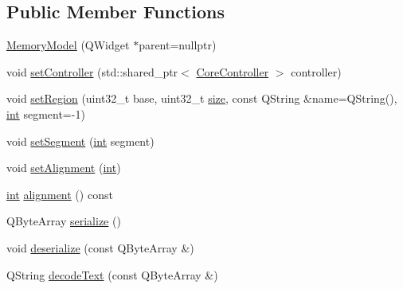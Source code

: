 \subsection*{Public Member Functions}
\begin{DoxyCompactItemize}
\item 
\mbox{\hyperlink{class_q_g_b_a_1_1_memory_model_a2311edb2695429110ac76feed01f57b2}{Memory\+Model}} (Q\+Widget $\ast$parent=nullptr)
\item 
void \mbox{\hyperlink{class_q_g_b_a_1_1_memory_model_acb6e5426f51a6a96e2861d2faef7bbfb}{set\+Controller}} (std\+::shared\+\_\+ptr$<$ \mbox{\hyperlink{class_q_g_b_a_1_1_core_controller}{Core\+Controller}} $>$ controller)
\item 
void \mbox{\hyperlink{class_q_g_b_a_1_1_memory_model_ab88fae3068abbdbb73095cbb5ef7fc79}{set\+Region}} (uint32\+\_\+t base, uint32\+\_\+t \mbox{\hyperlink{ioapi_8h_a014d89bd76f74ef3a29c8f04b473eb76}{size}}, const Q\+String \&name=Q\+String(), \mbox{\hyperlink{ioapi_8h_a787fa3cf048117ba7123753c1e74fcd6}{int}} segment=-\/1)
\item 
void \mbox{\hyperlink{class_q_g_b_a_1_1_memory_model_af72ed178d4890921fdabf860139e61fc}{set\+Segment}} (\mbox{\hyperlink{ioapi_8h_a787fa3cf048117ba7123753c1e74fcd6}{int}} segment)
\item 
void \mbox{\hyperlink{class_q_g_b_a_1_1_memory_model_a2bc5b85020957b515fc011bba99d940f}{set\+Alignment}} (\mbox{\hyperlink{ioapi_8h_a787fa3cf048117ba7123753c1e74fcd6}{int}})
\item 
\mbox{\hyperlink{ioapi_8h_a787fa3cf048117ba7123753c1e74fcd6}{int}} \mbox{\hyperlink{class_q_g_b_a_1_1_memory_model_a3e869b2efe98e35941d0f117df50a5b4}{alignment}} () const
\item 
Q\+Byte\+Array \mbox{\hyperlink{class_q_g_b_a_1_1_memory_model_a5fa79afa48814fc6acd209be3db283c4}{serialize}} ()
\item 
void \mbox{\hyperlink{class_q_g_b_a_1_1_memory_model_acb68f33a2d203e814ed2588409080d05}{deserialize}} (const Q\+Byte\+Array \&)
\item 
Q\+String \mbox{\hyperlink{class_q_g_b_a_1_1_memory_model_a9638dd27a9e7aec61fe5c8850dd5b414}{decode\+Text}} (const Q\+Byte\+Array \&)
\end{DoxyCompactItemize}

